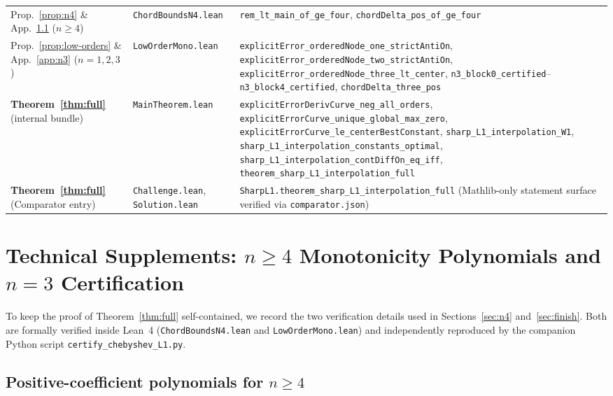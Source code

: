 \documentclass[11pt,a4paper]{article}
\newcommand{\code}[1]{\nolinkurl{#1}}
\theoremstyle{remark}
\numberwithin{equation}{section}
\begin{document}
\begin{table}[htbp]
\begin{tabular}{@{}p{3.4cm}>{\raggedright\arraybackslash}p{3.7cm}>{\raggedright\arraybackslash}p{8.0cm}@{}}
\addlinespace[3pt]
Prop.~\ref{prop:n4} \& App.~\ref{app:poly-n4} ($n \ge 4$) &
\code{ChordBoundsN4.lean} &
\code{rem_lt_main_of_ge_four}, \code{chordDelta_pos_of_ge_four} \\
\addlinespace[3pt]
Prop.~\ref{prop:low-orders} \& App.~\ref{app:n3} ($n=1,2,3$) &
\code{LowOrderMono.lean} &
\code{explicitError_orderedNode_one_strictAntiOn}, \code{explicitError_orderedNode_two_strictAntiOn}, \code{explicitError_orderedNode_three_lt_center}, \code{n3_block0_certified}--\code{n3_block4_certified}, \code{chordDelta_three_pos} \\
\addlinespace[3pt]
\textbf{Theorem~\ref{thm:full}} (internal bundle) &
\code{MainTheorem.lean} &
\code{explicitErrorDerivCurve_neg_all_orders}, \code{explicitErrorCurve_unique_global_max_zero}, \code{explicitErrorCurve_le_centerBestConstant}, \code{sharp_L1_interpolation_W1}, \code{sharp_L1_interpolation_constants_optimal}, \code{sharp_L1_interpolation_contDiffOn_eq_iff}, \code{theorem_sharp_L1_interpolation_full} \\
\addlinespace[3pt]
\textbf{Theorem~\ref{thm:full}} (Comparator entry) &
\code{Challenge.lean}, \code{Solution.lean} &
\code{SharpL1.theorem_sharp_L1_interpolation_full} (Mathlib-only statement surface verified via \code{comparator.json}) \\
\bottomrule
\end{tabular}
\end{table}

\appendix

\section{Technical Supplements: \texorpdfstring{$n \ge 4$}{n >= 4} Monotonicity Polynomials and \texorpdfstring{$n = 3$}{n = 3} Certification}
\label{app:tech}

To keep the proof of Theorem~\ref{thm:full} self-contained, we record the two verification details used in Sections~\ref{sec:n4} and~\ref{sec:finish}. Both are formally verified inside Lean~4 (\code{ChordBoundsN4.lean} and \code{LowOrderMono.lean}) and independently reproduced by the companion Python script \code{certify_chebyshev_L1.py}.

\subsection{Positive-coefficient polynomials for \texorpdfstring{$n \ge 4$}{n >= 4}}
\label{app:poly-n4}
\end{document}
